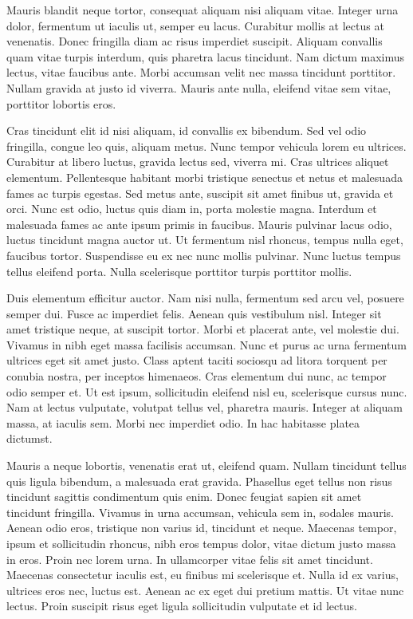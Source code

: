Mauris blandit neque tortor, consequat aliquam nisi aliquam vitae. Integer urna dolor, fermentum ut iaculis ut, semper eu lacus. Curabitur mollis at lectus at venenatis. Donec fringilla diam ac risus imperdiet suscipit. Aliquam convallis quam vitae turpis interdum, quis pharetra lacus tincidunt. Nam dictum maximus lectus, vitae faucibus ante. Morbi accumsan velit nec massa tincidunt porttitor. Nullam gravida at justo id viverra. Mauris ante nulla, eleifend vitae sem vitae, porttitor lobortis eros.

Cras tincidunt elit id nisi aliquam, id convallis ex bibendum. Sed vel odio fringilla, congue leo quis, aliquam metus. Nunc tempor vehicula lorem eu ultrices. Curabitur at libero luctus, gravida lectus sed, viverra mi. Cras ultrices aliquet elementum. Pellentesque habitant morbi tristique senectus et netus et malesuada fames ac turpis egestas. Sed metus ante, suscipit sit amet finibus ut, gravida et orci. Nunc est odio, luctus quis diam in, porta molestie magna. Interdum et malesuada fames ac ante ipsum primis in faucibus. Mauris pulvinar lacus odio, luctus tincidunt magna auctor ut. Ut fermentum nisl rhoncus, tempus nulla eget, faucibus tortor. Suspendisse eu ex nec nunc mollis pulvinar. Nunc luctus tempus tellus eleifend porta. Nulla scelerisque porttitor turpis porttitor mollis.

Duis elementum efficitur auctor. Nam nisi nulla, fermentum sed arcu vel, posuere semper dui. Fusce ac imperdiet felis. Aenean quis vestibulum nisl. Integer sit amet tristique neque, at suscipit tortor. Morbi et placerat ante, vel molestie dui. Vivamus in nibh eget massa facilisis accumsan. Nunc et purus ac urna fermentum ultrices eget sit amet justo. Class aptent taciti sociosqu ad litora torquent per conubia nostra, per inceptos himenaeos. Cras elementum dui nunc, ac tempor odio semper et. Ut est ipsum, sollicitudin eleifend nisl eu, scelerisque cursus nunc. Nam at lectus vulputate, volutpat tellus vel, pharetra mauris. Integer at aliquam massa, at iaculis sem. Morbi nec imperdiet odio. In hac habitasse platea dictumst.

Mauris a neque lobortis, venenatis erat ut, eleifend quam. Nullam tincidunt tellus quis ligula bibendum, a malesuada erat gravida. Phasellus eget tellus non risus tincidunt sagittis condimentum quis enim. Donec feugiat sapien sit amet tincidunt fringilla. Vivamus in urna accumsan, vehicula sem in, sodales mauris. Aenean odio eros, tristique non varius id, tincidunt et neque. Maecenas tempor, ipsum et sollicitudin rhoncus, nibh eros tempus dolor, vitae dictum justo massa in eros. Proin nec lorem urna. In ullamcorper vitae felis sit amet tincidunt. Maecenas consectetur iaculis est, eu finibus mi scelerisque et. Nulla id ex varius, ultrices eros nec, luctus est. Aenean ac ex eget dui pretium mattis. Ut vitae nunc lectus. Proin suscipit risus eget ligula sollicitudin vulputate et id lectus.


